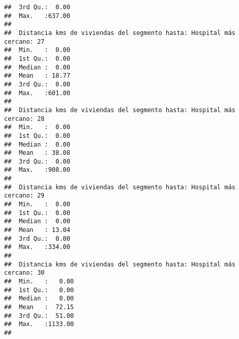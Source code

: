 \documentclass[11pt,]{article}
\begin{document}
\begin{verbatim}
##  3rd Qu.:  0.00                                                         
##  Max.   :637.00                                                         
##                                                                         
##  Distancia kms de viviendas del segmento hasta: Hospital más cercano: 27
##  Min.   :  0.00                                                         
##  1st Qu.:  0.00                                                         
##  Median :  0.00                                                         
##  Mean   : 18.77                                                         
##  3rd Qu.:  0.00                                                         
##  Max.   :601.00                                                         
##                                                                         
##  Distancia kms de viviendas del segmento hasta: Hospital más cercano: 28
##  Min.   :  0.00                                                         
##  1st Qu.:  0.00                                                         
##  Median :  0.00                                                         
##  Mean   : 38.08                                                         
##  3rd Qu.:  0.00                                                         
##  Max.   :908.00                                                         
##                                                                         
##  Distancia kms de viviendas del segmento hasta: Hospital más cercano: 29
##  Min.   :  0.00                                                         
##  1st Qu.:  0.00                                                         
##  Median :  0.00                                                         
##  Mean   : 13.04                                                         
##  3rd Qu.:  0.00                                                         
##  Max.   :334.00                                                         
##                                                                         
##  Distancia kms de viviendas del segmento hasta: Hospital más cercano: 30
##  Min.   :   0.00                                                        
##  1st Qu.:   0.00                                                        
##  Median :   0.00                                                        
##  Mean   :  72.15                                                        
##  3rd Qu.:  51.00                                                        
##  Max.   :1133.00                                                        
##                                                                         

\end{verbatim}
\end{document}
